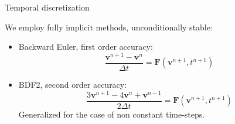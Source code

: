 \documentclass{beamer}
\begin{document}
\begin{frame}{Temporal discretization}
We employ fully implicit methods, unconditionally stable:
\begin{itemize}
	\item Backward Euler, first order accuracy:
	\begin{equation*}
	\frac{\mathbf{v}^{n+1}-\mathbf{v}^n}{\Delta t} = 
	\mathbf{F}(\mathbf{v}^{n+1}, 
	t^{n+1})
	\end{equation*}
	\item BDF2, second order accuracy:
	\begin{equation*}
	\frac{3\mathbf{v}^{n+1}- 4\mathbf{v}^{n} + \mathbf{v}^{n-1}}{2\Delta t} = 
	\mathbf{F}(\mathbf{v}^{n+1}, t^{n+1})
	\end{equation*}
	Generalized for the case of non constant time-steps.
\end{itemize}
\end{frame}
\end{document}
